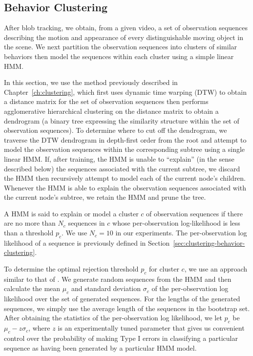 \subsection{Behavior Clustering}
\label{sec:batch-behavior-clustering}

After blob tracking, we obtain, from a given video, a set of
observation sequences describing the motion and appearance of every
distinguishable moving object in the scene.  We next partition the
observation sequences into clusters of similar behaviors then model
the sequences within each cluster using a simple linear HMM. 

In this section, we use the method previously described in
Chapter~\ref{ch:clustering}, which first uses dynamic time warping
(DTW) to obtain a distance matrix for the set of observation sequences
then performs agglomerative hierarchical clustering on the distance
matrix to obtain a dendrogram (a binary tree expressing the similarity
structure within the set of observation sequences).  To determine
where to cut off the dendrogram, we traverse the DTW dendrogram in
depth-first order from the root and attempt to model the observation
sequences within the corresponding subtree using a single linear HMM.
If, after training, the HMM is unable to ``explain'' (in the sense
described below) the sequences associated with the current subtree, we
discard the HMM then recursively attempt to model each of the current
node's children. Whenever the HMM is able to explain the observation
sequences associated with the current node's subtree, we retain the
HMM and prune the tree.

A HMM is said to explain or model a cluster $c$ of observation
sequences if there are no more than $N_c$ sequences in $c$ whose
per-observation log-likelihood is less than a threshold $p_c$.  We use
$N_c=10$ in our experiments. The per-observation log likelihood of a
sequence is previously defined in
Section~\ref{sec:clustering-behavior-clustering}.

To determine the optimal rejection threshold $p_c$ for cluster $c$, we
use an approach similar to that of . We
generate random sequences from the HMM and then calculate the mean
$\mu_c$ and standard deviation $\sigma_c$ of the per-observation log
likelihood over the set of generated sequences.  For the lengths of
the generated sequences, we simply use the average length of the
sequences in the bootstrap set.  After obtaining the statistics of the
per-observation log likelihood, we let $p_c$ be $\mu_c - z \sigma_c$,
where $z$ is an experimentally tuned parameter that gives us
convenient control over the probability of making Type I errors in
classifying a particular sequence as having been generated by a
particular HMM model.


